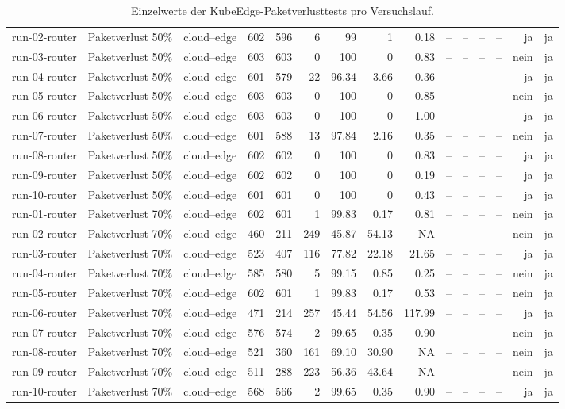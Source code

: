 \begin{table}
{\begin{tabular}{l l p{3.2cm} r r r r r r r r r r r r}
run-02-router & Paketverlust 50\% & cloud--edge & 602 & 596 & 6 & 99 & 1 & 0.18 & -- & -- & -- & -- & ja & ja \\
run-03-router & Paketverlust 50\% & cloud--edge & 603 & 603 & 0 & 100 & 0 & 0.83 & -- & -- & -- & -- & nein & ja \\
run-04-router & Paketverlust 50\% & cloud--edge & 601 & 579 & 22 & 96.34 & 3.66 & 0.36 & -- & -- & -- & -- & ja & ja \\
run-05-router & Paketverlust 50\% & cloud--edge & 603 & 603 & 0 & 100 & 0 & 0.85 & -- & -- & -- & -- & nein & ja \\
run-06-router & Paketverlust 50\% & cloud--edge & 603 & 603 & 0 & 100 & 0 & 1.00 & -- & -- & -- & -- & ja & ja \\
run-07-router & Paketverlust 50\% & cloud--edge & 601 & 588 & 13 & 97.84 & 2.16 & 0.35 & -- & -- & -- & -- & nein & ja \\
run-08-router & Paketverlust 50\% & cloud--edge & 602 & 602 & 0 & 100 & 0 & 0.83 & -- & -- & -- & -- & ja & ja \\
run-09-router & Paketverlust 50\% & cloud--edge & 602 & 602 & 0 & 100 & 0 & 0.19 & -- & -- & -- & -- & ja & ja \\
run-10-router & Paketverlust 50\% & cloud--edge & 601 & 601 & 0 & 100 & 0 & 0.43 & -- & -- & -- & -- & ja & ja \\
run-01-router & Paketverlust 70\% & cloud--edge & 602 & 601 & 1 & 99.83 & 0.17 & 0.81 & -- & -- & -- & -- & nein & ja \\
run-02-router & Paketverlust 70\% & cloud--edge & 460 & 211 & 249 & 45.87 & 54.13 & NA & -- & -- & -- & -- & nein & ja \\
run-03-router & Paketverlust 70\% & cloud--edge & 523 & 407 & 116 & 77.82 & 22.18 & 21.65 & -- & -- & -- & -- & ja & ja \\
run-04-router & Paketverlust 70\% & cloud--edge & 585 & 580 & 5 & 99.15 & 0.85 & 0.25 & -- & -- & -- & -- & nein & ja \\
run-05-router & Paketverlust 70\% & cloud--edge & 602 & 601 & 1 & 99.83 & 0.17 & 0.53 & -- & -- & -- & -- & nein & ja \\
run-06-router & Paketverlust 70\% & cloud--edge & 471 & 214 & 257 & 45.44 & 54.56 & 117.99 & -- & -- & -- & -- & ja & ja \\
run-07-router & Paketverlust 70\% & cloud--edge & 576 & 574 & 2 & 99.65 & 0.35 & 0.90 & -- & -- & -- & -- & nein & ja \\
run-08-router & Paketverlust 70\% & cloud--edge & 521 & 360 & 161 & 69.10 & 30.90 & NA & -- & -- & -- & -- & nein & ja \\
run-09-router & Paketverlust 70\% & cloud--edge & 511 & 288 & 223 & 56.36 & 43.64 & NA & -- & -- & -- & -- & nein & ja \\
run-10-router & Paketverlust 70\% & cloud--edge & 568 & 566 & 2 & 99.65 & 0.35 & 0.90 & -- & -- & -- & -- & ja & ja \\
\bottomrule
\end{tabular}%
}
\caption{Einzelwerte der KubeEdge-Paketverlusttests pro Versuchslauf.}
\label{tab:appendix-kubeedge-packet-loss-runs}
\end{table}
